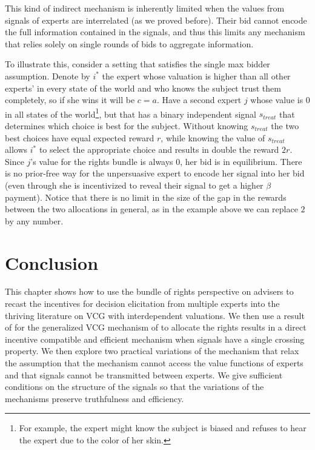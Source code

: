  
 This kind of indirect mechanism is inherently limited when the values from signals of experts are interrelated (as we proved before). Their bid cannot encode the full information contained in the signals, and thus this limits any mechanism that relies solely on single rounds of bids to aggregate information.
 
 To illustrate this, consider a setting that satisfies the single max bidder assumption.%
 Denote by $i^*$ the expert whose valuation is higher than all other experts' in every state of the world and who knows the subject trust them completely, so if she wins it will be $c=a$. Have a second expert $j$ whose value is $0$ in all states of the world\footnote{For example, the expert might know the subject is biased and refuses to hear the expert due to the color of her skin.}, but that has a binary independent signal $s_{treat}$ that determines which choice is best for the subject. Without knowing $s_{treat}$ the two best choices have equal expected reward $r$, while knowing the value of $s_{treat}$ allows $i^*$ to select the appropriate choice and results in double the reward $2r$.
 Since $j$'s value for the rights bundle is always 0, her bid is in equilibrium. 
 There is no prior-free way for the unpersuasive expert to encode her signal into her bid (even through she is incentivized to reveal their signal to get a higher $\beta$ payment). 
 Notice that there is no limit in the size of the gap in the rewards between the two allocations in general, as in the example above we can replace $2$ by any number.
 
 

\section{Conclusion}

This chapter shows how to use the bundle of rights perspective on advisers to recast the incentives for decision elicitation from multiple experts into the thriving literature on VCG with interdependent valuations.
We then use a result of \citep{roughgarden2016optimal} for the generalized VCG mechanism of \citep{maskin1992auctions} to allocate the rights results in a direct incentive compatible and efficient mechanism when signals have a single crossing property.
We then explore two practical variations of the mechanism that relax the assumption that the mechanism cannot access the value functions of experts and that signals cannot be transmitted between experts. We give sufficient conditions on the structure of the signals so that the variations of the mechanisms preserve truthfulness and efficiency.

